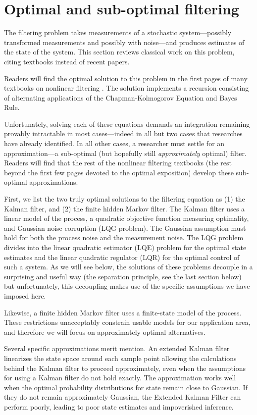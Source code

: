 \documentclass{article}
\begin{document}
\section{Optimal and sub-optimal filtering}
The filtering problem takes measurements of a stochastic
system---possibly transformed measurements and possibly with
noise---and produces estimates of the state of the system.  This
section reviews classical work on this problem, citing textbooks
instead of recent papers.

Readers will find the optimal solution to this problem in the first
pages of many textbooks on nonlinear filtering \cite{ristic2003beyond,
  crisan2011oxford, smith2013sequential, chopin2020introduction}.  The
solution implements a recursion consisting of alternating applications
of the Chapman-Kolmogorov Equation and Bayes Rule.

Unfortunately, solving each of these equations demands an integration
remaining provably intractable in most cases---indeed in all but two
cases that researches have already identified.  In all other cases, a
researcher must settle for an approximation---a sub-optimal (but
hopefully still \emph{approximately} optimal) filter.  Readers will
find that the rest of the nonlinear filtering textbooks (the rest
beyond the first few pages devoted to the optimal exposition) develop
these sub-optimal approximations.

First, we list the two truly optimal solutions to the filtering
equation as (1) the Kalman filter, and (2) the finite hidden Markov
filter.  The Kalman filter uses a linear model of the process, a
quadratic objective function measuring optimality, and Gaussian noise
corruption (LQG problem).  The Gaussian assumption must hold for both
the process noise and the measurement noise.  The LQG problem divides
into the linear quadratic estimator (LQE) problem for the optimal
state estimates and the linear quadratic regulator (LQR) for the
optimal control of such a system.  As we will see below, the solutions
of these problems decouple in a surprising and useful way (the
separation principle, see the last section below) but unfortunately,
this decoupling makes use of the specific assumptions we have imposed
here.

Likewise, a finite hidden Markov filter uses a finite-state model of
the process. These restrictions unacceptably constrain usable models
for our application area, and therefore we will focus on approximately
optimal alternatives.

Several specific approximations merit mention.  An extended Kalman
filter linearizes the state space around each sample point allowing
the calculations behind the Kalman filter to proceed approximately,
even when the assumptions for using a Kalman filter do not hold
exactly. The approximation works well when the optimal probability
distributions for state remain close to Gaussian.  If they do not
remain approximately Gaussian, the Extended Kalman Filter can perform
poorly, leading to poor state estimates and impoverished inference.
\end{document}
